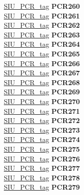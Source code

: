 \begin{DoxyCompactItemize}
\begin{tabbing}
\>\>\mbox{\hyperlink{unionSIU__tag_1_1SIU__PCR__tag}{SIU\_PCR\_tag}} {\bfseries PCR260}\\
\>\>\mbox{\hyperlink{unionSIU__tag_1_1SIU__PCR__tag}{SIU\_PCR\_tag}} {\bfseries PCR261}\\
\>\>\mbox{\hyperlink{unionSIU__tag_1_1SIU__PCR__tag}{SIU\_PCR\_tag}} {\bfseries PCR262}\\
\>\>\mbox{\hyperlink{unionSIU__tag_1_1SIU__PCR__tag}{SIU\_PCR\_tag}} {\bfseries PCR263}\\
\>\>\mbox{\hyperlink{unionSIU__tag_1_1SIU__PCR__tag}{SIU\_PCR\_tag}} {\bfseries PCR264}\\
\>\>\mbox{\hyperlink{unionSIU__tag_1_1SIU__PCR__tag}{SIU\_PCR\_tag}} {\bfseries PCR265}\\
\>\>\mbox{\hyperlink{unionSIU__tag_1_1SIU__PCR__tag}{SIU\_PCR\_tag}} {\bfseries PCR266}\\
\>\>\mbox{\hyperlink{unionSIU__tag_1_1SIU__PCR__tag}{SIU\_PCR\_tag}} {\bfseries PCR267}\\
\>\>\mbox{\hyperlink{unionSIU__tag_1_1SIU__PCR__tag}{SIU\_PCR\_tag}} {\bfseries PCR268}\\
\>\>\mbox{\hyperlink{unionSIU__tag_1_1SIU__PCR__tag}{SIU\_PCR\_tag}} {\bfseries PCR269}\\
\>\>\mbox{\hyperlink{unionSIU__tag_1_1SIU__PCR__tag}{SIU\_PCR\_tag}} {\bfseries PCR270}\\
\>\>\mbox{\hyperlink{unionSIU__tag_1_1SIU__PCR__tag}{SIU\_PCR\_tag}} {\bfseries PCR271}\\
\>\>\mbox{\hyperlink{unionSIU__tag_1_1SIU__PCR__tag}{SIU\_PCR\_tag}} {\bfseries PCR272}\\
\>\>\mbox{\hyperlink{unionSIU__tag_1_1SIU__PCR__tag}{SIU\_PCR\_tag}} {\bfseries PCR273}\\
\>\>\mbox{\hyperlink{unionSIU__tag_1_1SIU__PCR__tag}{SIU\_PCR\_tag}} {\bfseries PCR274}\\
\>\>\mbox{\hyperlink{unionSIU__tag_1_1SIU__PCR__tag}{SIU\_PCR\_tag}} {\bfseries PCR275}\\
\>\>\mbox{\hyperlink{unionSIU__tag_1_1SIU__PCR__tag}{SIU\_PCR\_tag}} {\bfseries PCR276}\\
\>\>\mbox{\hyperlink{unionSIU__tag_1_1SIU__PCR__tag}{SIU\_PCR\_tag}} {\bfseries PCR277}\\
\>\>\mbox{\hyperlink{unionSIU__tag_1_1SIU__PCR__tag}{SIU\_PCR\_tag}} {\bfseries PCR278}\\
\>\>\mbox{\hyperlink{unionSIU__tag_1_1SIU__PCR__tag}{SIU\_PCR\_tag}} {\bfseries PCR279}\\

\end{tabbing}
\end{DoxyCompactItemize}
